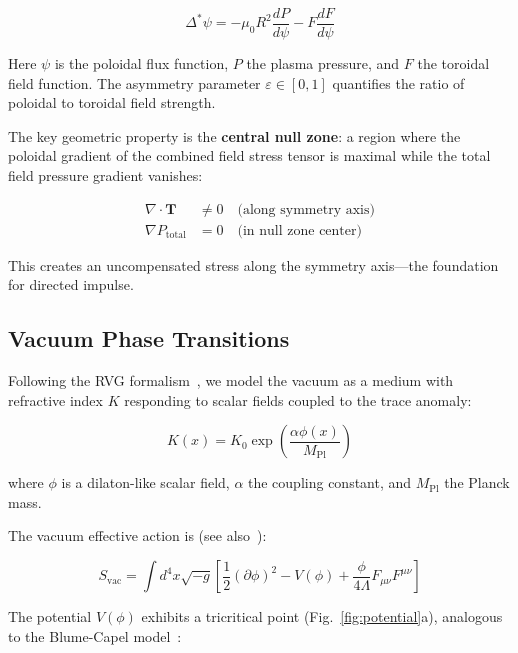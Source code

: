 \documentclass[preprint,12pt]{elsarticle}
\begin{document}
\begin{equation}
\Delta^* \psi = -\mu_0 R^2 \frac{dP}{d\psi} - F\frac{dF}{d\psi}
\label{eq:gradshafranov}
\end{equation}

Here $\psi$ is the poloidal flux function, $P$ the plasma pressure, and $F$ the toroidal field function. The asymmetry parameter $\varepsilon \in [0,1]$ quantifies the ratio of poloidal to toroidal field strength.

The key geometric property is the \textbf{central null zone}: a region where the poloidal gradient of the combined field stress tensor is maximal while the total field pressure gradient vanishes:

\begin{align}
\nabla \cdot \mathbf{T} &\neq 0 \quad \text{(along symmetry axis)} \\
\nabla P_{\text{total}} &= 0 \quad \text{(in null zone center)}
\end{align}

This creates an uncompensated stress along the symmetry axis---the foundation for directed impulse.

\subsection{Vacuum Phase Transitions}
\label{sec:vacuum}

Following the RVG formalism~\cite{hofseth2026a}, we model the vacuum as a medium with refractive index $K$ responding to scalar fields coupled to the trace anomaly:

\begin{equation}
K(x) = K_0 \exp\left(\frac{\alpha \phi(x)}{M_{\text{Pl}}}\right)
\label{eq:refractive}
\end{equation}

where $\phi$ is a dilaton-like scalar field, $\alpha$ the coupling constant, and $M_{\text{Pl}}$ the Planck mass.

The vacuum effective action is (see also~\cite{volovik2003,wen2004}):

\begin{equation}
S_{\text{vac}} = \int d^4x \sqrt{-g} \left[ \frac{1}{2}(\partial\phi)^2 - V(\phi) + \frac{\phi}{4\Lambda} F_{\mu\nu}F^{\mu\nu} \right]
\label{eq:action}
\end{equation}

The potential $V(\phi)$ exhibits a tricritical point (Fig.~\ref{fig:potential}a), analogous to the Blume-Capel model~\cite{blume2025}:
\end{document}
